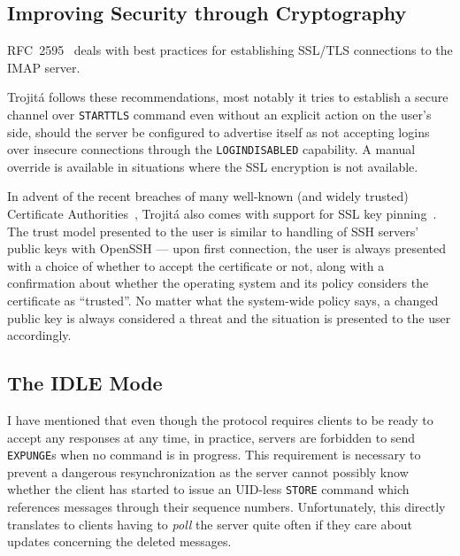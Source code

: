 \documentclass[trojita]{subfiles}
\begin{document}
\subsection{Improving Security through Cryptography}

RFC~2595~\cite{rfc2595} deals with best practices for establishing SSL/TLS connections to the IMAP server.

\begin{trojitabehavior}
Trojitá
follows these recommendations, most notably it tries to establish a secure channel over {\tt STARTTLS} command even
without an explicit action on the user's side, should the server be configured to advertise itself as not accepting
logins over insecure connections through the {\tt LOGINDISABLED} capability.  A manual override is available in
situations where the SSL encryption is not available.

In advent of the recent breaches of many well-known (and widely trusted) Certificate Authorities~\cite{ssl-breaches},
Trojitá also comes with support for SSL key pinning~\cite{ssl-pinning}.  The trust model presented to the user is
similar to handling of SSH servers' public keys with OpenSSH --- upon first connection, the user is always presented with
a choice of whether to accept the certificate or not, along with a confirmation about whether the operating system and
its policy considers the certificate as ``trusted''.  No matter what the system-wide policy says, a changed public key
is always considered a threat and the situation is presented to the user accordingly.
\end{trojitabehavior}

\subsection{The IDLE Mode}
\label{sec:imap-idle}

I have mentioned that even though the protocol requires clients to be ready to accept any responses at any time, in
practice, servers are forbidden to send {\tt EXPUNGE}s when no command is in progress.  This requirement is necessary to
prevent a dangerous resynchronization as the server cannot possibly know whether the client has started to issue an
UID-less {\tt STORE} command which references messages through their sequence numbers.  Unfortunately, this directly
translates to clients having to {\em poll} the server quite often if they care about updates concerning the deleted
messages.
\end{document}
